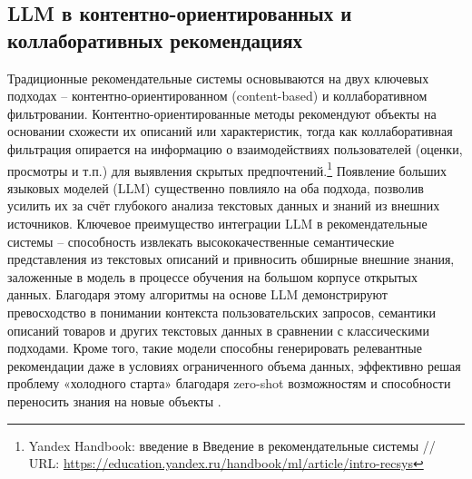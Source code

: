 \subsection*{LLM в контентно-ориентированных и коллаборативных рекомендациях}

Традиционные рекомендательные системы основываются на двух ключевых подходах – контентно-ориентированном (content-based) и коллаборативном фильтровании. Контентно-ориентированные методы рекомендуют объекты на основании схожести их описаний или характеристик, тогда как коллаборативная фильтрация опирается на информацию о взаимодействиях пользователей (оценки, просмотры и т.п.) для выявления скрытых предпочтений.\footnote{Yandex Handbook: введение в Введение в рекомендательные системы // URL: \url{https://education.yandex.ru/handbook/ml/article/intro-recsys}} Появление больших языковых моделей (LLM) существенно повлияло на оба подхода, позволив усилить их за счёт глубокого анализа текстовых данных и знаний из внешних источников. Ключевое преимущество интеграции LLM в рекомендательные системы – способность извлекать высококачественные семантические представления из текстовых описаний и привносить обширные внешние знания, заложенные в модель в процессе обучения на большом корпусе открытых данных. 
Благодаря этому алгоритмы на основе LLM демонстрируют превосходство в понимании контекста пользовательских запросов, семантики описаний товаров и других текстовых данных в сравнении с классическими подходами. Кроме того, такие модели способны генерировать релевантные рекомендации даже в условиях ограниченного объема данных, эффективно решая проблему «холодного старта» благодаря zero-shot возможностям и способности переносить знания на новые объекты \citep{wu2024surveylargelanguagemodels}.

